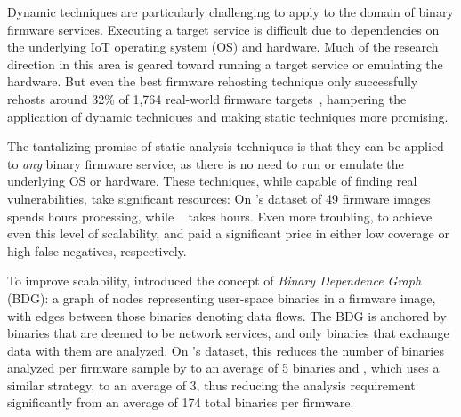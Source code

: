 Dynamic techniques are particularly challenging to apply to the domain of binary firmware services.
Executing a target service is difficult due to dependencies on the underlying IoT operating system (OS) and hardware.
Much of the research direction in this area is geared toward running a target service or emulating the hardware.
But even the best firmware rehosting technique only successfully rehosts around 32\% of 1,764 real-world firmware targets~\cite{greenhouse}, hampering the application of dynamic techniques and making static techniques more promising.

The tantalizing promise of static analysis techniques is that they can be applied to \emph{any} binary firmware service, as there is no need to run or emulate the underlying OS or hardware.
These techniques, while capable of finding real vulnerabilities, take significant resources:
On \karonte's dataset of 49 firmware images \satc~\cite{SaTC} spends \SaTConKaronteHours hours processing, while \karonte~\cite{karonte} takes \KaronteonKaronteHours hours.
Even more troubling, to achieve even this level of scalability, \karonte and \satc paid a significant price in either low coverage or high false negatives, respectively.



To improve scalability, \karonte introduced the concept of \emph{Binary Dependence Graph} (BDG): a graph of nodes representing user-space binaries in a firmware image, with edges between those binaries denoting data flows.
The BDG is anchored by binaries that are deemed to be network services, and only binaries that exchange data with them are analyzed.
On \karonte's dataset, this reduces the number of binaries analyzed per firmware sample by \karonte to an average of 5 binaries and \satc, which uses a similar strategy, to an average of 3, thus reducing the analysis requirement significantly from an average of 174 total binaries per firmware.


